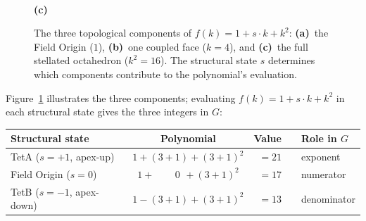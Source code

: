 \documentclass[aps,prd,preprint,superscriptaddress,showpacs,preprintnumbers,amsmath,amssymb,nofootinbib]{revtex4-2}
\begin{document}
\begin{figure}[H]
\hfill
\begin{minipage}[b]{0.33\textwidth}
\centering
{}
\\[4pt]
\textbf{(c)}
\end{minipage}
\caption{The three topological components of $f(k) = 1 + s \cdot k + k^2$:
\textbf{(a)}~the Field Origin ($1$),
\textbf{(b)}~one coupled face ($k = 4$), and
\textbf{(c)}~the full stellated octahedron ($k^2 = 16$).
The structural state $s$ determines which components contribute to the polynomial's evaluation.}
\label{fig:polynomial}
\end{figure}

Figure~\ref{fig:polynomial} illustrates the three components; evaluating $f(k) = 1 + s \cdot k + k^2$ in each structural state gives the three integers in $G$:

\begin{center}
\renewcommand{\arraystretch}{1.4}
\begin{tabular*}{\textwidth}{@{\extracolsep{\fill}} lcrcl}
\hline
\textbf{Structural state} & \textbf{Polynomial} & \textbf{Value} & & \textbf{Role in $G$} \\
\hline
TetA ($s = +1$, apex-up) & $1 + (3{+}1) + (3{+}1)^2$ & $= 21$ & & exponent \\
Field Origin ($s = 0$) & $1 + \phantom{(3{+}}0\phantom{)} + (3{+}1)^2$ & $= 17$ & & numerator \\
TetB ($s = -1$, apex-down) & $1 - (3{+}1) + (3{+}1)^2$ & $= 13$ & & denominator \\
\hline
\end{tabular*}
\end{center}
\end{document}
